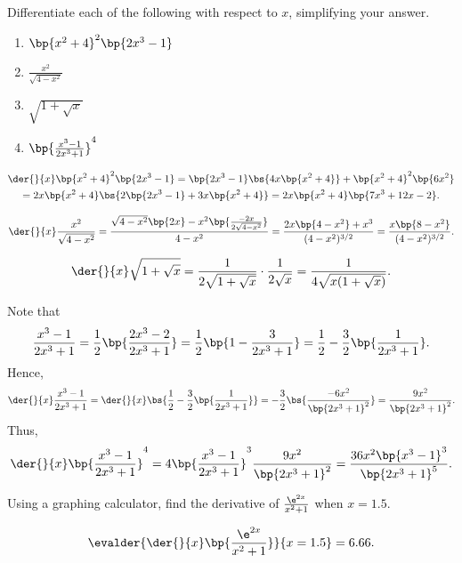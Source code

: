 \clearpage
\begin{problem}
    Differentiate each of the following with respect to $x$, simplifying your answer.

    \begin{enumerate}
        \item $\bp{x^2 + 4}^2\bp{2x^3 -1}$
        \item $\frac{x^2}{\sqrt{4-x^2}}$
        \item $\sqrt{1+\sqrt x}$
        \item $\bp{\frac{x^3-1}{2x^3+1}}^4$
    \end{enumerate}
\end{problem}
\begin{solution}
    \begin{ppart}
        \begin{gather*}
            \der{}{x} \bp{x^2 + 4}^2\bp{2x^3 -1} = \bp{2x^3 - 1} \bs{4x \bp{x^2 + 4}} + \bp{x^2 + 4}^2\bp{6x^2}\\
            = 2x\bp{x^2 + 4}\bs{2\bp{2x^3 - 1} + 3x\bp{x^2 + 4}} = 2x\bp{x^2 + 4}\bp{7x^3 + 12x - 2}.
        \end{gather*}
    \end{ppart}
    \begin{ppart}
        \[\der{}{x} \frac{x^2}{\sqrt{4-x^2}} = \frac{\sqrt{4-x^2} \bp{2x} - x^2 \bp{\frac{-2x}{2\sqrt{4-x^2}}}}{4-x^2} = \frac{2x\bp{4-x^2} + x^3}{(4-x^2)^{3/2}} = \frac{x \bp{8-x^2}}{(4-x^2)^{3/2}}.\]
    \end{ppart}
    \begin{ppart}
        \[\der{}{x} \sqrt{1+\sqrt x} = \frac1{2\sqrt{1+\sqrt x}} \cdot \frac1{2\sqrt x} = \frac1{4\sqrt{x(1+\sqrt x)}}.\]
    \end{ppart}
    \begin{ppart}
        Note that \[\frac{x^3-1}{2x^3 + 1} = \frac12 \bp{\frac{2x^3 - 2}{2x^3 + 1}} = \frac12\bp{1 - \frac{3}{2x^3 + 1}} = \frac12 - \frac32 \bp{\frac{1}{2x^3 + 1}}.\] Hence, \[\der{}{x} \frac{x^3-1}{2x^3 + 1} = \der{}{x} \bs{\frac12 - \frac32 \bp{\frac{1}{2x^3 + 1}}} = -\frac32\bs{\frac{-6x^2}{\bp{2x^3 + 1}^2}} = \frac{9x^2}{\bp{2x^3 +1}^2}.\] Thus, \[\der{}{x} \bp{\frac{x^3-1}{2x^3+1}}^4 = 4\bp{\frac{x^3-1}{2x^3+1}}^3 \frac{9x^2}{\bp{2x^3 +1}^2} = \frac{36x^2\bp{x^3-1}^3}{\bp{2x^3+1}^5}.\]
    \end{ppart}
\end{solution}

\begin{problem}
    Using a graphing calculator, find the derivative of $\frac{\e^{2x}}{x^2+1}$ when $x = 1.5$.
\end{problem}
\begin{solution}
    \[\evalder{\der{}{x} \bp{\frac{\e^{2x}}{x^2+1}}}{x = 1.5} = 6.66.\]
\end{solution}

